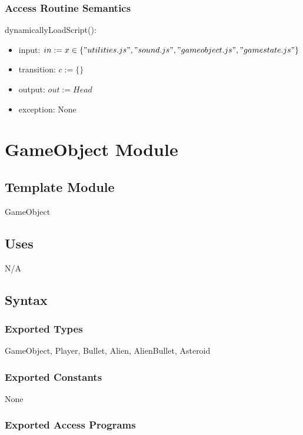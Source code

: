 \documentclass[12pt]{article}
\begin{document}
\subsubsection* {Access Routine Semantics}

dynamicallyLoadScript():
\begin{itemize}
    \item input: $in := x \in \{"utilities.js","sound.js","gameobject.js","gamestate.js"\}$
    \item transition: $c := \{\}$
    \item output: $out := Head$
    \item exception: None
\end{itemize}


\newpage

\section*{GameObject Module}

\subsection*{Template Module}

GameObject

\subsection*{Uses}

N/A

\subsection*{Syntax}

\subsubsection*{Exported Types}

GameObject, Player, Bullet, Alien, AlienBullet, Asteroid

\subsubsection*{Exported Constants}

None

\subsubsection*{Exported Access Programs}
\end{document}
